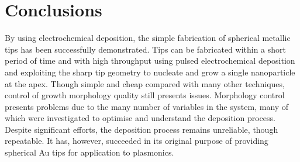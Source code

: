 \documentclass[12pt, a4paper, twoside]{book}
\begin{document}


\section{Conclusions}

By using electrochemical deposition, the simple fabrication of spherical metallic tips has been successfully demonstrated. Tips can be fabricated within a short period of time and with high throughput using pulsed electrochemical deposition and exploiting the sharp tip geometry to nucleate and grow a single nanoparticle at the apex. Though simple and cheap compared with many other techniques, control of growth morphology quality still presents issues.
Morphology control presents problems due to the many number of variables in the system, many of which were investigated to optimise and understand the deposition process. Despite significant efforts, the deposition process remains unreliable, though repeatable.
It has, however, succeeded in its original purpose of providing spherical Au tips for application to plasmonics.
\end{document}
